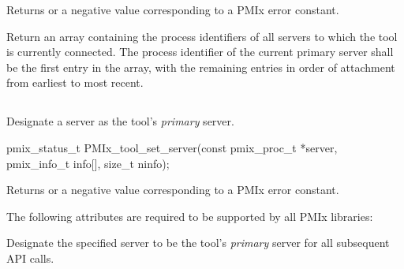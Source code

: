 Returns  or a negative value corresponding to a PMIx error constant.

\descr

Return an array containing the  process identifiers of all servers to which the tool is currently connected. The process identifier of the current primary server shall be the first entry in the array, with the remaining entries in order of attachment from earliest to most recent.


\subsection{}

\summary

Designate a server as the tool's \emph{primary} server.

\format

\cspecificstart
\begin{codepar}
pmix_status_t
PMIx_tool_set_server(const pmix_proc_t *server,
                     pmix_info_t info[], size_t ninfo);
\end{codepar}
\cspecificend

\begin{arglist}
\end{arglist}

Returns  or a negative value corresponding to a PMIx error constant.

\reqattrstart
The following attributes are required to be supported by all \ac{PMIx} libraries:


\reqattrend

\descr

Designate the specified server to be the tool's \emph{primary} server for all subsequent \ac{API} calls.


\subsection{}


